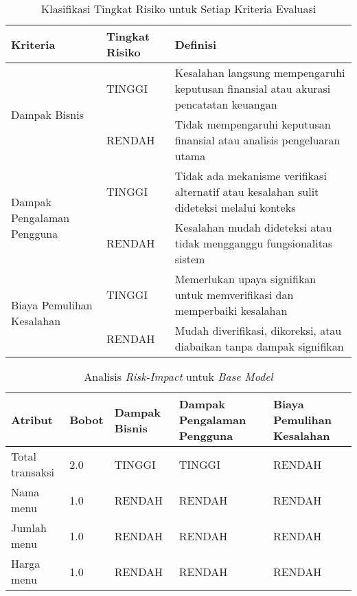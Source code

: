 \begin{table}[h!]
    \centering
    \caption{Klasifikasi Tingkat Risiko untuk Setiap Kriteria Evaluasi}
    \label{tab:risk-classification}
    \begin{tabular}{|m{3cm}|l|m{7.5cm}|}
        \hline
        \textbf{Kriteria} & \textbf{Tingkat Risiko} & \textbf{Definisi} \\ \hline
        
        \multirow{2}{=}{Dampak Bisnis} & TINGGI & Kesalahan langsung mempengaruhi keputusan finansial atau akurasi pencatatan keuangan \\ \cline{2-3}
        & RENDAH & Tidak mempengaruhi keputusan finansial atau analisis pengeluaran utama \\ \hline
        
        \multirow{2}{=}{Dampak Pengalaman Pengguna} & TINGGI & Tidak ada mekanisme verifikasi alternatif atau kesalahan sulit dideteksi melalui konteks \\ \cline{2-3}
        & RENDAH & Kesalahan mudah dideteksi atau tidak mengganggu fungsionalitas sistem \\ \hline

        \multirow{2}{=}{Biaya Pemulihan Kesalahan} & TINGGI & Memerlukan upaya signifikan untuk memverifikasi dan memperbaiki kesalahan \\ \cline{2-3}
        & RENDAH & Mudah diverifikasi, dikoreksi, atau diabaikan tanpa dampak signifikan \\ \hline
    \end{tabular}
\end{table}

\begin{table}[h!]
    \centering
    \caption{Analisis \emph{Risk-Impact} untuk \emph{Base Model}}
    \label{tab:risk-impact-base-model}
    \begin{tabularx}{\textwidth}{|p{3cm}|p{1cm}|p{2cm}|p{2.5cm}|X|}
        \hline
        \textbf{Atribut} & \textbf{Bobot} & \textbf{Dampak Bisnis} & \textbf{Dampak Pengalaman Pengguna} & \textbf{Biaya Pemulihan Kesalahan} \\ \hline
        Total transaksi & 2.0 & TINGGI & TINGGI & RENDAH \\ \hline
        Nama menu & 1.0 & RENDAH & RENDAH & RENDAH \\ \hline
        Jumlah menu & 1.0 & RENDAH & RENDAH & RENDAH \\ \hline
        Harga menu & 1.0 & RENDAH & RENDAH & RENDAH \\ \hline
    \end{tabularx}
\end{table}

